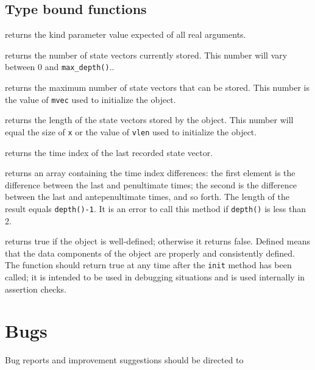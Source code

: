 \documentclass[11pt]{article}
\begin{document}
\subsection{Type bound functions}
\begin{description}[style=nextline]\setlength{\itemsep}{0pt}
\item[\texttt{real_kind()}]
  returns the kind parameter value expected of all real arguments.
\item[\texttt{depth()}]
  returns the number of state vectors currently stored.  This number will
  vary between 0 and \texttt{max_depth()}..
\item[\texttt{max_depth()}]
  returns the maximum number of state vectors that can be stored.  This
  number is the value of \texttt{mvec} used to initialize the object.
\item[\texttt{state_size()}]
  returns the length of the state vectors stored by the object.  This number
  will equal the size of \texttt{x} or the value of \texttt{vlen} used to
  initialize the object.
\item[\texttt{last_time()}]
  returns the time index of the last recorded state vector.
\item[\texttt{time_deltas()}]
  returns an array containing the time index differences: the first element
  is the difference between the last and penultimate times; the second is the
  difference between the last and antepenultimate times, and so forth.  The
  length of the result equals \texttt{depth()-1}.  It is an error to call this
  method if \texttt{depth()} is less than 2.
\item[\texttt{defined()}]
  returns true if the object is well-defined; otherwise it returns false.
  Defined means that the data components of the object are properly and
  consistently defined.  The function should return true at any time after
  the \texttt{init} method has been called; it is intended to be used in
  debugging situations and is used internally in assertion checks.
\end{description}


\section{Bugs}
Bug reports and improvement suggestions should be directed to

\LatexManEnd
\end{document}
